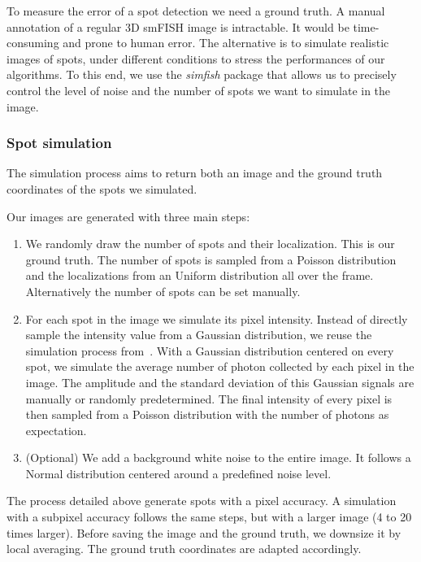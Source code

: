 To measure the error of a spot detection we need a ground truth.
A manual annotation of a regular 3D \ac{smFISH} image is intractable.
It would be time-consuming and prone to human error.
The alternative is to simulate realistic images of spots, under different conditions to stress the performances of our algorithms.
To this end, we use the \emph{simfish} package that allows us to precisely control the level of noise and the number of spots we want to simulate in the image.

\subsubsection{Spot simulation}

The simulation process aims to return both an image and the ground truth coordinates of the spots we simulated.

\noindent
Our images are generated with three main steps:

\begin{enumerate}
	\item We randomly draw the number of spots and their localization.
	This is our ground truth.
	The number of spots is sampled from a Poisson distribution and the localizations from an Uniform distribution all over the frame.
	Alternatively the number of spots can be set manually.
	\item For each spot in the image we simulate its pixel intensity.
	Instead of directly sample the intensity value from a Gaussian distribution, we reuse the simulation process from~\cite{bahry_rs-fish_2021}.
	With a Gaussian distribution centered on every spot, we simulate the average number of photon collected by each pixel in the image.
	The amplitude and the standard deviation of this Gaussian signals are manually or randomly predetermined.
	The final intensity of every pixel is then sampled from a Poisson distribution with the number of photons as expectation.
	\item (Optional) We add a background white noise to the entire image.
	It follows a Normal distribution centered around a predefined noise level.
\end{enumerate}


The process detailed above generate spots with a pixel accuracy.
A simulation with a subpixel accuracy follows the same steps, but with a larger image (4 to 20 times larger).
Before saving the image and the ground truth, we downsize it by local averaging.
The ground truth coordinates are adapted accordingly.

